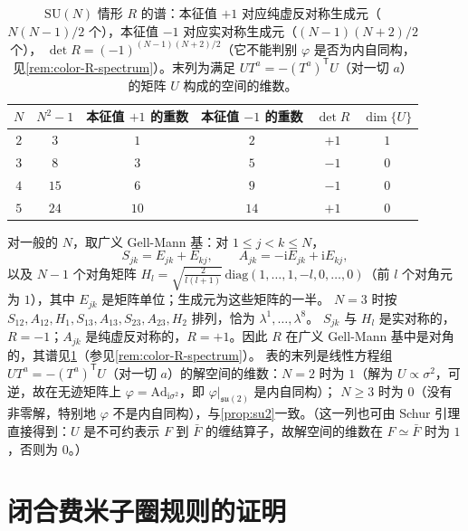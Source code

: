 \documentclass[UTF8,a4paper,11pt,fontset=fandol]{ctexart}
\theoremstyle{cplain}
\theoremstyle{cdefinition}
\theoremstyle{cremark}
\numberwithin{equation}{section}
\newcommand{\tp}{\mathsf{T}}                         %
\newcommand{\su}{\mathfrak{su}}
\newcommand{\ii}{\mathrm{i}}                        %
\begin{document}
\begin{table}[htbp]
\centering
\caption{$\mathrm{SU}(N)$ 情形 $R$ 的谱：本征值 $+1$ 对应纯虚反对称生成元（$N(N-1)/2$ 个），本征值 $-1$ 对应实对称生成元（$(N-1)(N+2)/2$ 个），
$\det R=(-1)^{(N-1)(N+2)/2}$（它不能判别 $\varphi$ 是否为内自同构，见\cref{rem:color-R-spectrum}）。末列为满足 $UT^a=-(T^a)^{\tp}U$（对一切 $a$）的矩阵 $U$ 构成的空间的维数。}
\label{tab:app-su3-suN}
\renewcommand{\arraystretch}{1.2}
\begin{tabular}{@{}cccccc@{}}
\toprule
$N$ & $N^2-1$ & 本征值 $+1$ 的重数 & 本征值 $-1$ 的重数 & $\det R$ & $\dim\{U\}$\\
\midrule
$2$ & $3$ & $1$ & $2$ & $+1$ & $1$\\
$3$ & $8$ & $3$ & $5$ & $-1$ & $0$\\
$4$ & $15$ & $6$ & $9$ & $-1$ & $0$\\
$5$ & $24$ & $10$ & $14$ & $+1$ & $0$\\
\bottomrule
\end{tabular}
\end{table}


对一般的 $N$，取广义 Gell-Mann 基：对 $1\le j<k\le N$，
\[
S_{jk}=E_{jk}+E_{kj},\qquad A_{jk}=-\ii E_{jk}+\ii E_{kj},
\]
以及 $N-1$ 个对角矩阵 $H_l=\sqrt{\tfrac{2}{l(l+1)}}\,\mathrm{diag}(1,\dots,1,-l,0,\dots,0)$（前 $l$ 个对角元为 $1$），其中 $E_{jk}$ 是矩阵单位；生成元为这些矩阵的一半。
$N=3$ 时按 $S_{12},A_{12},H_1,S_{13},A_{13},S_{23},A_{23},H_2$ 排列，恰为 $\lambda^1,\dots,\lambda^8$。
$S_{jk}$ 与 $H_l$ 是实对称的，$R=-1$；$A_{jk}$ 是纯虚反对称的，$R=+1$。因此 $R$ 在广义 Gell-Mann 基中是对角的，其谱见\cref{tab:app-su3-suN}（参见\cref{rem:color-R-spectrum}）。
表的末列是线性方程组 $UT^a=-(T^a)^{\tp}U$（对一切 $a$）的解空间的维数：$N=2$ 时为 $1$（解为 $U\propto\sigma^2$，可逆，故在无迹矩阵上 $\varphi=\mathrm{Ad}_{\ii\sigma^2}$，即 $\varphi|_{\su(2)}$ 是内自同构）；
$N\ge3$ 时为 $0$（没有非零解，特别地 $\varphi$ 不是内自同构），与\cref{prop:su2}一致。（这一列也可由 Schur 引理直接得到：$U$ 是不可约表示 $F$ 到 $\bar F$ 的缠结算子，故解空间的维数在 $F\simeq\bar F$ 时为 $1$，否则为 $0$。）

\section{闭合费米子圈规则的证明}\label{app:wick}
\end{document}
